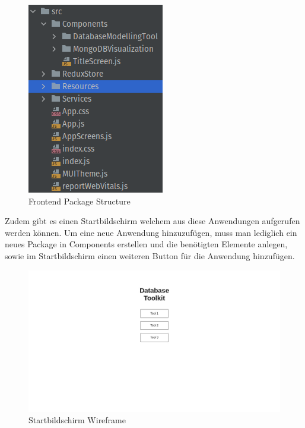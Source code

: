 \begin{figure}[H]
    \includegraphics[width=\textwidth / 3]{images/frontend_package_structure}
    \caption{Frontend Package Structure}
    \label{fig:frontend_package_structure}
\end{figure}

Zudem gibt es einen Startbildschirm welchem aus diese Anwendungen aufgerufen werden können.
Um eine neue Anwendung hinzuzufügen, muss man lediglich ein neues Package in Components erstellen und die benötigten Elemente anlegen, sowie im Startbildschirm einen weiteren Button für die Anwendung hinzufügen.

\begin{figure}[H]
    \includegraphics[width=\textwidth]{images/wireframe_titlescreen}
    \caption{Startbildschirm Wireframe}
    \label{fig:wireframe_titlescreen}
\end{figure}

